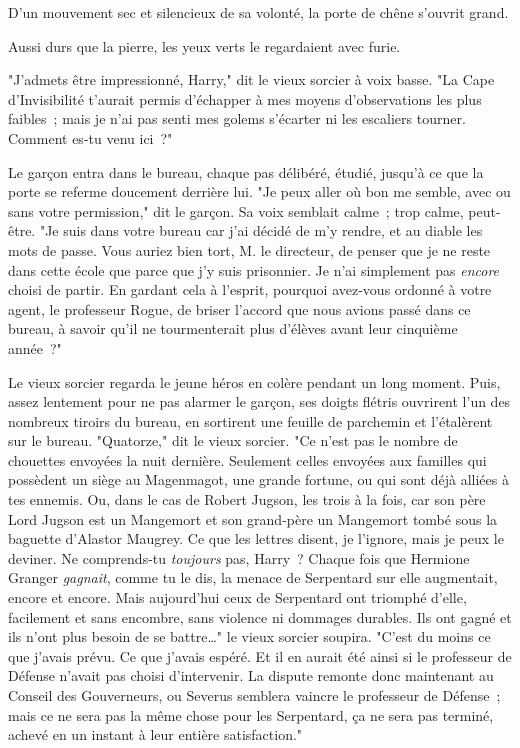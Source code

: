 D'un mouvement sec et silencieux de sa volonté, la porte de chêne s'ouvrit grand.

Aussi durs que la pierre, les yeux verts le regardaient avec furie.

"J'admets être impressionné, Harry," dit le vieux sorcier à voix basse. "La Cape d'Invisibilité t'aurait permis d'échapper à mes moyens d'observations les plus faibles~; mais je n'ai pas senti mes golems s'écarter ni les escaliers tourner. Comment es-tu venu ici~?"

Le garçon entra dans le bureau, chaque pas délibéré, étudié, jusqu'à ce que la porte se referme doucement derrière lui. "Je peux aller où bon me semble, avec ou sans votre permission," dit le garçon. Sa voix semblait calme~; trop calme, peut-être. "Je suis dans votre bureau car j'ai décidé de m'y rendre, et au diable les mots de passe. Vous auriez bien tort, M. le directeur, de penser que je ne reste dans cette école que parce que j'y suis prisonnier. Je n'ai simplement pas \emph{encore} choisi de partir. En gardant cela à l'esprit, pourquoi avez-vous ordonné à votre agent, le professeur Rogue, de briser l'accord que nous avions passé dans ce bureau, à savoir qu'il ne tourmenterait plus d'élèves avant leur cinquième année~?"

Le vieux sorcier regarda le jeune héros en colère pendant un long moment. Puis, assez lentement pour ne pas alarmer le garçon, ses doigts flétris ouvrirent l'un des nombreux tiroirs du bureau, en sortirent une feuille de parchemin et l'étalèrent sur le bureau. "Quatorze," dit le vieux sorcier. "Ce n'est pas le nombre de chouettes envoyées la nuit dernière. Seulement celles envoyées aux familles qui possèdent un siège au Magenmagot, une grande fortune, ou qui sont déjà alliées à tes ennemis. Ou, dans le cas de Robert Jugson, les trois à la fois, car son père Lord Jugson est un Mangemort et son grand-père un Mangemort tombé sous la baguette d'Alastor Maugrey. Ce que les lettres disent, je l'ignore, mais je peux le deviner. Ne comprends-tu \emph{toujours} pas, Harry~? Chaque fois que Hermione Granger \emph{gagnait}, comme tu le dis, la menace de Serpentard sur elle augmentait, encore et encore. Mais aujourd'hui ceux de Serpentard ont triomphé d'elle, facilement et sans encombre, sans violence ni dommages durables. Ils ont gagné et ils n'ont plus besoin de se battre…" le vieux sorcier soupira. "C'est du moins ce que j'avais prévu. Ce que j'avais espéré. Et il en aurait été ainsi si le professeur de Défense n'avait pas choisi d'intervenir. La dispute remonte donc maintenant au Conseil des Gouverneurs, ou Severus semblera vaincre le professeur de Défense~; mais ce ne sera pas la même chose pour les Serpentard, ça ne sera pas terminé, achevé en un instant à leur entière satisfaction."

